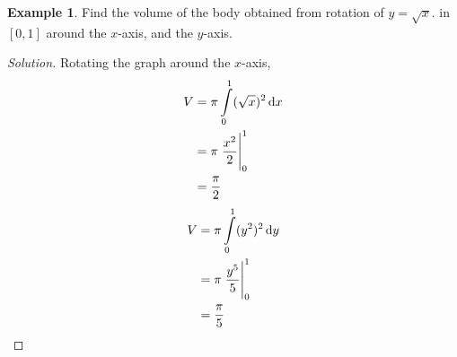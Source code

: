 \documentclass[fleqn, 12pt]{article}
\theoremstyle{definition}
\newtheorem{example}{Example}
\theoremstyle{theorem}
\newenvironment{solution}
{\begin{proof}[Solution]\let\qed\relax}
	{\end{proof}}
\begin{document}
\begin{example}
	Find the volume of the body obtained from rotation of $y = \sqrt{x}$. in $[0, 1]$ around the $x$-axis, and the $y$-axis.
\end{example}

\begin{solution}
	Rotating the graph around the $x$-axis,
	\begin{align*}
		V &= \pi \int\limits_{0}^{1} (\sqrt{x})^2 \dif x\\
		&= \pi \left. \dfrac{x^2}{2} \right\rvert_{0}^{1}\\
		&= \dfrac{\pi}{2}
	\end{align*}
	\begin{align*}
		V &= \pi \int\limits_{0}^{1} (y^2)^2 \dif y\\
		&= \pi \left. \dfrac{y^5}{5} \right\rvert_{0}^{1}\\
		&= \dfrac{\pi}{5}
	\end{align*}
\end{solution}
\end{document}
